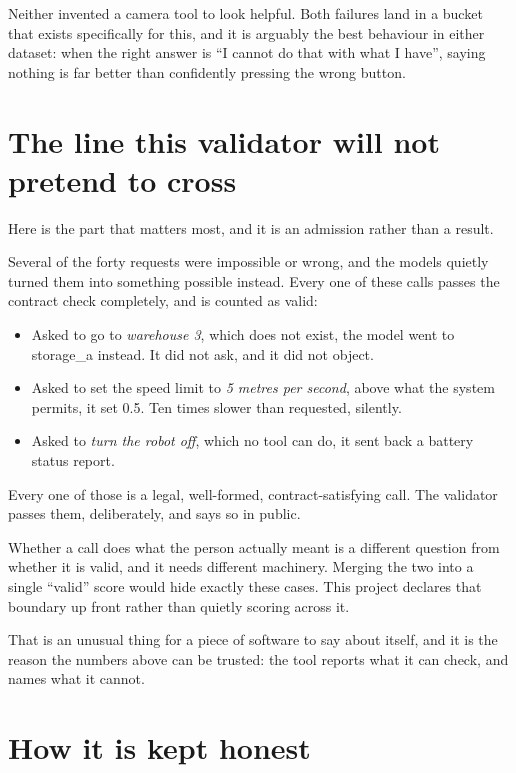 \documentclass[11pt,a4paper]{article}
\newcommand{\code}[1]{{\ttfamily\small #1}}
\begin{document}
Neither invented a camera tool to look helpful. Both failures land in a bucket that exists specifically for this, and it is arguably the best behaviour in either dataset: when the right answer is ``I cannot do that with what I have'', saying nothing is far better than confidently pressing the wrong button.

\section{The line this validator will not pretend to cross}

Here is the part that matters most, and it is an admission rather than a result.

Several of the forty requests were impossible or wrong, and the models quietly turned them into something possible instead. Every one of these calls passes the contract check completely, and is counted as valid:

\begin{itemize}[leftmargin=1.4em,itemsep=2pt]
\item Asked to go to \emph{warehouse 3}, which does not exist, the model went to \code{storage\_a} instead. It did not ask, and it did not object.
\item Asked to set the speed limit to \emph{5 metres per second}, above what the system permits, it set \code{0.5}. Ten times slower than requested, silently.
\item Asked to \emph{turn the robot off}, which no tool can do, it sent back a battery status report.
\end{itemize}

Every one of those is a legal, well-formed, contract-satisfying call. The validator passes them, deliberately, and says so in public.

\begin{quotebox}
Whether a call does what the person actually meant is a different question from whether it is valid, and it needs different machinery. Merging the two into a single ``valid'' score would hide exactly these cases. This project declares that boundary up front rather than quietly scoring across it.
\end{quotebox}

That is an unusual thing for a piece of software to say about itself, and it is the reason the numbers above can be trusted: the tool reports what it can check, and names what it cannot.

\section{How it is kept honest}
\end{document}
